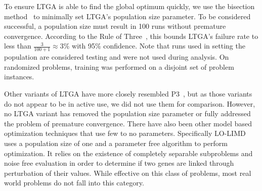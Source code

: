 \documentclass{sig-alternate}
\begin{document}
To ensure LTGA is able to find the global optimum quickly, we use the bisection method~\cite{goldman:2012:ltga}
to minimally set LTGA's population size parameter.  To be considered successful, a
population size must result in 100 runs without premature convergence.
According to the Rule of Three~\cite{jovanovic:1997:ruleofthree}, this bounds
LTGA's failure rate to less than $\frac{3}{100+1} \approx 3\%$ with 95\% confidence.
Note that runs used in setting the population are considered testing and were not
used during analysis.  On randomized problems, training was performed on a disjoint
set of problem instances.

\begin{comment}
Since LTGA requires a population size parameter, we thought it most fair to
compare against LTGA with an optimized population size, even though P3
receives no such tuning. To set the population size parameter, we use
the bisection method~\cite{goldman:2012:ltga}, which determines the minimum population
size required to meet a specified success criteria.  As P3 will run until the global optimum
is found or the evaluation limit is reached, we want to ensure LTGA has a similar requirement
on its success.  Therefore, using the Rule of Three~\cite{jovanovic:1997:ruleofthree}, we
can provide a bound on the probability of failure $\frac{3}{k+1}$ with $95\%$ confidence,
where $k$ is a number of runs without a failure.  Here we state that a population size
is successful if it performs 100 runs without failing to find the global optimum, meaning
the probability of that population failing to solve problems of the same class is bounded above by
$3\%$.  Note that these 100 runs are considered training, and the results from the bisection
runs are not included during the comparative testing.  Furthermore, when testing on problem
classes, bisection is performed on a different set of instances than testing.
\end{comment}

Other variants of LTGA have more closely resembled P3~\cite{goldman:2012:ltga},
but as those variants do not appear to be in active use, we did not use them for comparison.
However, no LTGA variant has removed the population size parameter
or fully addressed the problem of premature convergence.
There have also been other model based optimization techniques that use few to
no parameters.  Specifically LO-LIMD~\cite{posik:2011:parameterless} uses a
population size of one and a parameter free algorithm to perform optimization.
It relies on the existence of completely separable subproblems and noise free evaluation in order to determine
if two genes are linked through perturbation of their values.  While effective on
this class of problems, most real world problems do not fall into this category.
\end{document}
